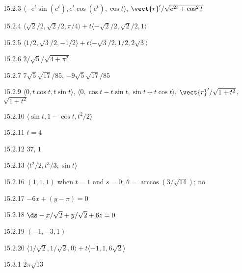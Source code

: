 \begin{Answer}{15.2.3}
 $\langle -e^t\sin(e^t),e^t\cos(e^t),\cos t\rangle$,
$\vect{r}'/\sqrt{e^{2t}+\cos^2 t}$
\end{Answer}
\begin{Answer}{15.2.4}
 $\langle \sqrt2/2,\sqrt2/2,\pi/4\rangle+
t\langle -\sqrt2/2,\sqrt2/2,1\rangle$
\end{Answer}
\begin{Answer}{15.2.5}
 $\langle 1/2,\sqrt3/2,-1/2\rangle+
t\langle -\sqrt3/2,1/2,2\sqrt3\rangle$
\end{Answer}
\begin{Answer}{15.2.6}
 $2/\sqrt5/\sqrt{4+\pi^2}$
\end{Answer}
\begin{Answer}{15.2.7}
 $7\sqrt{5}\sqrt{17}/85$, $-9\sqrt{5}\sqrt{17}/85$
\end{Answer}
\begin{Answer}{15.2.9}
 $\langle 0,t\cos t,t\sin t\rangle$,
$\langle 0,\cos t-t\sin t,\sin t+t\cos t\rangle$,
$\vect{r}'/\sqrt{1+t^2}$, $\sqrt{1+t^2}$
\end{Answer}
\begin{Answer}{15.2.10}
 $\langle \sin t,1-\cos t,t^2/2\rangle$
\end{Answer}
\begin{Answer}{15.2.11}
 $t=4$
\end{Answer}
\begin{Answer}{15.2.12}
 $37$, $1$
\end{Answer}
\begin{Answer}{15.2.13}
 $\langle t^2/2,t^3/3,\sin t\rangle$
\end{Answer}
\begin{Answer}{15.2.16}
 $(1,1,1)$ when $t=1$ and $s=0$; $\theta=\arccos(3/\sqrt{14})$; no
\end{Answer}
\begin{Answer}{15.2.17}
 $-6x+(y-\pi)=0$
\end{Answer}
\begin{Answer}{15.2.18}
 $\ds -x/\sqrt2+y/\sqrt2+6z=0$
\end{Answer}
\begin{Answer}{15.2.19}
 $(-1,-3,1)$
\end{Answer}
\begin{Answer}{15.2.20}
 $\langle 1/\sqrt2,1/\sqrt2,0\rangle+t\langle -1,1,6\sqrt2\rangle$
\end{Answer}
\begin{Answer}{15.3.1}
	$2\pi\sqrt{13}$
\end{Answer}

